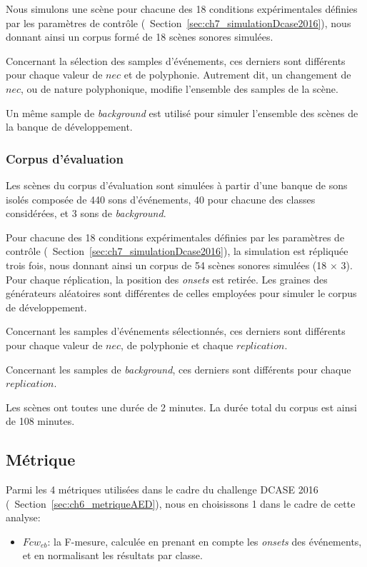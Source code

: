 Nous simulons une scène pour chacune des 18 conditions expérimentales définies par les paramètres de contrôle (\cf~Section~\ref{sec:ch7_simulationDcase2016}), nous donnant ainsi un corpus formé de 18 scènes sonores simulées.

Concernant la sélection des samples d'événements, ces derniers sont différents pour chaque valeur de $nec$ et de polyphonie. Autrement dit, un changement de $nec$, ou de nature polyphonique, modifie l'ensemble des samples de la scène. 

Un même sample de \emph{background} est utilisé pour simuler l'ensemble des scènes de la banque de développement.

\subsubsection{Corpus d'évaluation}

Les scènes du corpus d'évaluation sont simulées à partir d'une banque de sons isolés composée de 440 sons d'événements, 40 pour chacune des classes considérées, et 3 sons de \emph{background}.

Pour chacune des 18 conditions expérimentales définies par les paramètres de contrôle (\cf~Section~\ref{sec:ch7_simulationDcase2016}), la simulation est répliquée trois fois, nous donnant ainsi un corpus de 54 scènes sonores simulées (18 $\times$ 3). Pour chaque réplication, la position des \emph{onsets} est retirée. Les graines des générateurs aléatoires sont différentes de celles employées pour simuler le corpus de développement.

Concernant les samples d'événements sélectionnés, ces derniers sont différents pour chaque valeur de $nec$, de polyphonie et chaque $replication$. 
 
Concernant les samples de \emph{background}, ces derniers sont différents pour chaque $replication$. 

Les scènes ont toutes une durée de 2 minutes. La durée total du corpus est ainsi de 108 minutes.

\subsection{Métrique}

Parmi les 4 métriques utilisées dans le cadre du challenge DCASE 2016 (\cf~Section~\ref{sec:ch6_metriqueAED}), nous en choisissons 1 dans le cadre de cette analyse:

\begin{itemize}
\item $Fcw_{eb}$: la F-mesure, calculée en prenant en compte les \emph{onsets} des événements, et en normalisant les résultats par classe.
\end{itemize}

